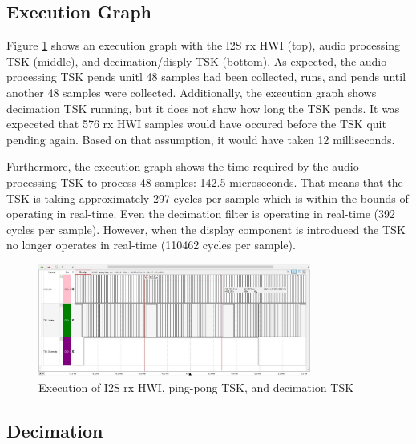 \documentclass[11pt,pdftex,portrait,letterpaper]{article}
\begin{document}
\subsection{Execution Graph}

Figure \ref{f:fig3} shows an execution graph with the I2S rx HWI (top), audio processing TSK (middle), and decimation/disply TSK (bottom). As expected, the audio processing TSK pends unitl 48 samples had been collected, runs, and pends until another 48 samples were  collected. Additionally, the execution graph shows decimation TSK running, but it does not show how long the TSK pends. It was expeceted that 576 rx HWI samples would have occured before the TSK quit pending again. Based on that assumption, it would have taken 12 milliseconds. 

Furthermore, the execution graph shows the time required by the audio processing TSK to process 48 samples: 142.5 microseconds. That means that the TSK is taking approximately 297 cycles per sample which is within the bounds of operating in real-time. Even the decimation filter is operating in real-time (392 cycles per sample). However, when the display component is introduced the TSK no longer operates in real-time (110462 cycles per sample).

\begin{figure}[h]
\centering
\includegraphics[width=0.8\textwidth]{./exec}
\caption{Execution of I2S rx HWI, ping-pong TSK, and decimation TSK }
\label{f:fig3}
\end{figure}

\subsection{Decimation}
\end{document}
